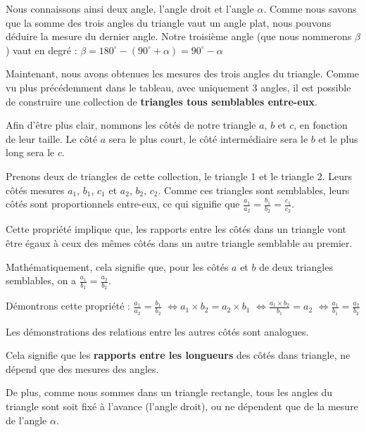 \documentclass[a4paper]{article}
\begin{document}
			Nous connaissons ainsi deux angle, l'angle droit et l'angle $\alpha$.
			Comme nous savons que la somme des trois angles du triangle vaut un angle plat,
			nous pouvons déduire la mesure du dernier angle.
			Notre troisième angle (que nous nommerons $\beta$) vaut en degré : $\beta = 180^\circ - (90^\circ + \alpha) = 90^\circ - \alpha$

			\medbreak

			Maintenant, nous avons obtenues les mesures des trois angles du triangle.
			Comme vu plus précédemment dans le tableau,
			avec uniquement 3 angles, il est possible de construire une collection de \textbf{triangles tous semblables entre-eux}.

			Afin d'être plus clair, nommons les côtés de notre triangle $a$, $b$ et $c$, en fonction de leur taille.
			Le côté $a$ sera le plus court, le côté intermédiaire sera le $b$ et le plus long sera le $c$.

			\medbreak

			Prenons deux de triangles de cette collection, le triangle 1 et le triangle 2. 
			Leurs côtés mesures $a_1$, $b_1$, $c_1$ et $a_2$, $b_2$, $c_2$.
			Comme ces triangles sont semblables, 
			leurs côtés sont proportionnels entre-eux,
			ce qui signifie que $\frac{a_1}{a_2} = \frac{b_1}{b_2} = \frac{c_1}{c_2}$.

			Cette propriété implique que, les rapports entre les côtés dans un triangle 
			vont être égaux à ceux des mêmes côtés dans un autre triangle semblable au premier.

			\medbreak

			Mathématiquement, cela signifie que, 
			pour les côtés $a$ et $b$ de deux triangles semblables, 
			on a $\frac{a_1}{b_1} = \frac{a_2}{b_2}$.

			Démontrons cette propriété :
			$\frac{a_1}{a_2} = \frac{b_1}{b_2}$
			$\Longleftrightarrow a_1 \times b_2 = a_2 \times b_1$
			$\Longleftrightarrow \frac{a_1 \times b_2}{b_1} = a_2$
			$\Longleftrightarrow \frac{a_1}{b_1} = \frac{a_2}{b_2}$

			Les démonstrations des relations entre les autres côtés sont analogues.

			\medbreak

			Cela signifie que les \textbf{rapports entre les longueurs} des côtés dans triangle, ne dépend que des mesures des angles.

			De plus, comme nous sommes dans un triangle rectangle,
			tous les angles du triangle sont soit fixé à l'avance (l'angle droit), 
			ou ne dépendent que de la mesure de l'angle $\alpha$. 
\end{document}
